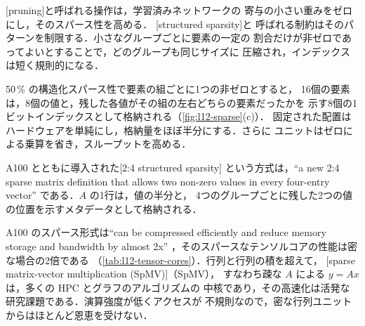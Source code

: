 \documentclass[../main.tex]{subfiles}
\begin{document}
\begin{definition}
  [pruning]と呼ばれる操作は，学習済みネットワークの
  寄与の小さい重みをゼロにし，そのスパース性を高める．
  [structured sparsity]と
  呼ばれる制約はそのパターンを制限する．小さなグループごとに要素の一定の
  割合だけが非ゼロであってよいとすることで，どのグループも同じサイズに
  圧縮され，インデックスは短く規則的になる．
\end{definition}

50\,\% の構造化スパース性で要素の組ごとに1つの非ゼロとすると，
16個の要素は，8個の値と，残した各値がその組の左右どちらの要素だったかを
示す8個の1ビットインデックスとして格納される（\cref{fig:l12-sparse}(c)）．
固定された配置はハードウェアを単純にし，格納量をほぼ半分にする．さらに
ユニットはゼロによる乗算を省き，スループットを高める．

\begin{definition}[2:4構造化スパース性]
  A100 とともに導入された[2:4 structured sparsity]
  という方式は，\enquote{a new 2:4 sparse matrix definition that allows
  two non-zero values in every four-entry vector}
  \cite{nvidia2020ampere}である．$A$ の1行は，値の半分と，
  4つのグループごとに残した2つの値の位置を示すメタデータとして格納される．
\end{definition}


A100 のスパース形式は\enquote{can be compressed efficiently and reduce
memory storage and bandwidth by almost 2x}
\cite{nvidia2020ampere}，そのスパースなテンソルコアの性能は密な場合の2倍である
（\cref{tab:l12-tensor-cores}）．行列と行列の積を超えて，
[sparse matrix-vector multiplication (SpMV)]（SpMV），
すなわち疎な $A$ による $y = Ax$ は，多くの HPC とグラフのアルゴリズムの
中核であり，その高速化は活発な研究課題である．演算強度が低くアクセスが
不規則なので，密な行列ユニットからはほとんど恩恵を受けない．
\end{document}
